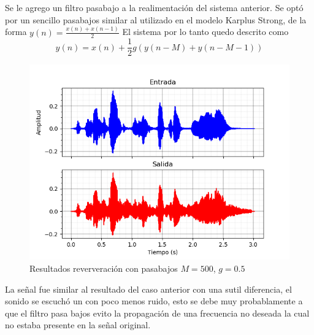 \documentclass[assd_tp2_main.tex]{subfiles}
\begin{document}
Se le agrego un filtro pasabajo a la realimentación del sistema anterior. Se optó por un sencillo pasabajos similar al utilizado en el modelo Karplus Strong, de la forma $y(n)=\frac{x(n)+x(n-1)}{2}$
El sistema por lo tanto quedo descrito como
\begin{equation}
y(n)=x(n)+\frac{1}{2}g(y(n-M)+y(n-M-1))
\end{equation}
\begin{figure}[H]	
	\centering
	\includegraphics[scale=1]{graficos/EJ8/eco_pb.png}
	\caption{Resultados reververación con pasabajos $M=500$, $g=0.5$ }
	\label{fig:bloqueElemental}
\end{figure}

La señal fue similar al resultado del caso anterior con una sutil diferencia, el sonido se escuchó un con poco menos ruido, esto se debe muy probablamente a que el filtro pasa bajos evito la propagación de una frecuencia no deseada la cual no estaba presente en la señal original.
\end{document}
